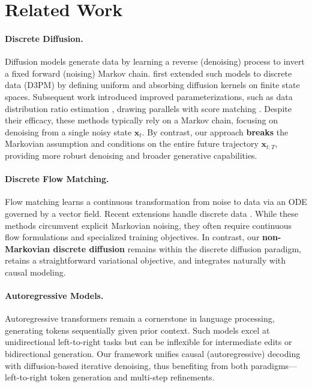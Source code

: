\section{Related Work}

\paragraph{Discrete Diffusion.}
Diffusion models \citep{ho2020denoisingdiffusionprobabilisticmodels} generate data by learning a reverse (denoising) process to invert a fixed forward (noising) Markov chain. \citet{d3pm} first extended such models to discrete data (D3PM) by defining uniform and absorbing diffusion kernels on finite state spaces. Subsequent work introduced improved parameterizations, such as data distribution ratio estimation \citep{lou2024discretediffusionmodelingestimating}, drawing parallels with score matching \citep{song2021scorebasedgenerativemodelingstochastic}. 
Despite their efficacy, these methods typically rely on a Markov chain, focusing on denoising from a single noisy state \(\mathbf{x}_t\). By contrast, our approach \textbf{breaks} the Markovian assumption and conditions on the entire future trajectory \(\mathbf{x}_{t:T}\), providing more robust denoising and broader generative capabilities.

\paragraph{Discrete Flow Matching.}
Flow matching \citep{lipman2023flowmatchinggenerativemodeling, tong2024improvinggeneralizingflowbasedgenerative} learns a continuous transformation from noise to data via an ODE governed by a vector field. Recent extensions handle discrete data \citep{gat2024discreteflowmatching, davis2024fisherflowmatchinggenerative, stark2024dirichletflowmatchingapplications}. While these methods circumvent explicit Markovian noising, they often require continuous flow formulations and specialized training objectives. In contrast, our \textbf{non-Markovian discrete diffusion} remains within the discrete diffusion paradigm, retains a straightforward variational objective, and integrates naturally with causal modeling.

\paragraph{Autoregressive Models.}
Autoregressive transformers \citep{vaswani2017attention, chowdhery2023palm, touvron2023llama} remain a cornerstone in language processing, generating tokens sequentially given prior context. Such models excel at unidirectional left-to-right tasks but can be inflexible for intermediate edits or bidirectional generation. Our framework unifies causal (autoregressive) decoding with diffusion-based iterative denoising, thus benefiting from both paradigms—left-to-right token generation and multi-step refinements.

